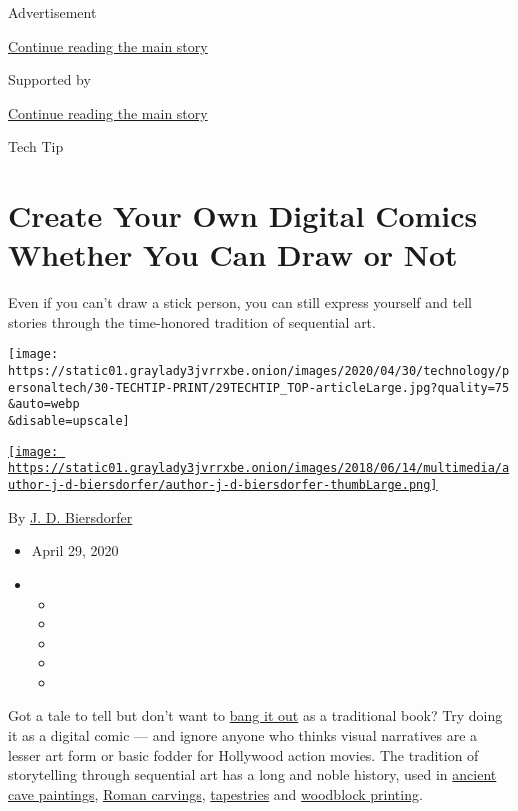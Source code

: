 Advertisement

\protect\hyperlink{after-top}{Continue reading the main story}

Supported by

\protect\hyperlink{after-sponsor}{Continue reading the main story}

Tech Tip

\hypertarget{create-your-own-digital-comics-whether-you-can-draw-or-not}{%
\section{Create Your Own Digital Comics Whether You Can Draw or
Not}\label{create-your-own-digital-comics-whether-you-can-draw-or-not}}

Even if you can't draw a stick person, you can still express yourself
and tell stories through the time-honored tradition of sequential art.

\texttt{[image: https://static01.graylady3jvrrxbe.onion/images/2020/04/30/technology/personaltech/30-TECHTIP-PRINT/29TECHTIP\_TOP-articleLarge.jpg?quality=75\\\&auto=webp\\\&disable=upscale]}

\href{https://www.nytimes3xbfgragh.onion/by/j-d-biersdorfer}{\texttt{[image: https://static01.graylady3jvrrxbe.onion/images/2018/06/14/multimedia/author-j-d-biersdorfer/author-j-d-biersdorfer-thumbLarge.png]}}

By \href{https://www.nytimes3xbfgragh.onion/by/j-d-biersdorfer}{J. D.
Biersdorfer}

\begin{itemize}
\item
  April 29, 2020
\item
  \begin{itemize}
  \item
  \item
  \item
  \item
  \item
  \end{itemize}
\end{itemize}

Got a tale to tell but don't want to
\href{https://www.nytimes3xbfgragh.onion/2019/10/30/technology/personaltech/national-novel-writing-month-apps-tools.html}{bang
it out} as a traditional book? Try doing it as a digital comic --- and
ignore anyone who thinks visual narratives are a lesser art form or
basic fodder for Hollywood action movies. The tradition of storytelling
through sequential art has a long and noble history, used in
\href{https://archeologie.culture.fr/lascaux/en}{ancient cave
paintings},
\href{https://www.nationalgeographic.com/trajan-column/index.html}{Roman
carvings},
\href{https://www.bayeuxmuseum.com/en/the-bayeux-tapestry/}{tapestries}
and
\href{https://blog.britishmuseum.org/hokusai-the-father-of-manga/}{woodblock
printing}.

